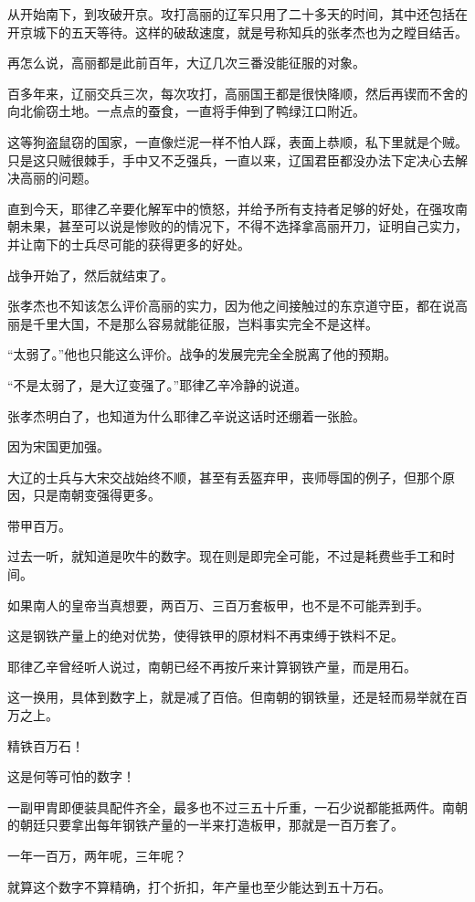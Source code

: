 从开始南下，到攻破开京。攻打高丽的辽军只用了二十多天的时间，其中还包括在开京城下的五天等待。这样的破敌速度，就是号称知兵的张孝杰也为之瞠目结舌。

再怎么说，高丽都是此前百年，大辽几次三番没能征服的对象。

百多年来，辽丽交兵三次，每次攻打，高丽国王都是很快降顺，然后再锲而不舍的向北偷窃土地。一点点的蚕食，一直将手伸到了鸭绿江口附近。

这等狗盗鼠窃的国家，一直像烂泥一样不怕人踩，表面上恭顺，私下里就是个贼。只是这只贼很棘手，手中又不乏强兵，一直以来，辽国君臣都没办法下定决心去解决高丽的问题。

直到今天，耶律乙辛要化解军中的愤怒，并给予所有支持者足够的好处，在强攻南朝未果，甚至可以说是惨败的的情况下，不得不选择拿高丽开刀，证明自己实力，并让南下的士兵尽可能的获得更多的好处。

战争开始了，然后就结束了。

张孝杰也不知该怎么评价高丽的实力，因为他之间接触过的东京道守臣，都在说高丽是千里大国，不是那么容易就能征服，岂料事实完全不是这样。

“太弱了。”他也只能这么评价。战争的发展完完全全脱离了他的预期。

“不是太弱了，是大辽变强了。”耶律乙辛冷静的说道。

张孝杰明白了，也知道为什么耶律乙辛说这话时还绷着一张脸。

因为宋国更加强。

大辽的士兵与大宋交战始终不顺，甚至有丢盔弃甲，丧师辱国的例子，但那个原因，只是南朝变强得更多。

带甲百万。

过去一听，就知道是吹牛的数字。现在则是即完全可能，不过是耗费些手工和时间。

如果南人的皇帝当真想要，两百万、三百万套板甲，也不是不可能弄到手。

这是钢铁产量上的绝对优势，使得铁甲的原材料不再束缚于铁料不足。

耶律乙辛曾经听人说过，南朝已经不再按斤来计算钢铁产量，而是用石。

这一换用，具体到数字上，就是减了百倍。但南朝的钢铁量，还是轻而易举就在百万之上。

精铁百万石！

这是何等可怕的数字！

一副甲胄即便装具配件齐全，最多也不过三五十斤重，一石少说都能抵两件。南朝的朝廷只要拿出每年钢铁产量的一半来打造板甲，那就是一百万套了。

一年一百万，两年呢，三年呢？

就算这个数字不算精确，打个折扣，年产量也至少能达到五十万石。

